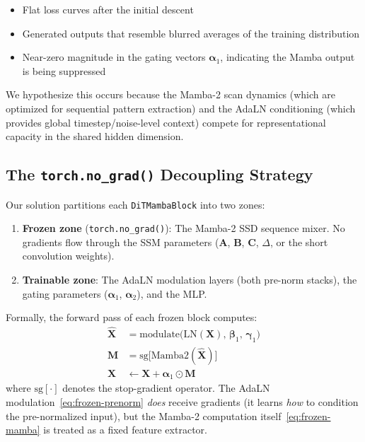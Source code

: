 \documentclass[12pt,letterpaper]{report}
\begin{document}
\begin{itemize}
    \item Flat loss curves after the initial descent
    \item Generated outputs that resemble blurred averages of the training
        distribution
    \item Near-zero magnitude in the gating vectors $\boldsymbol{\alpha}_1$,
        indicating the Mamba output is being suppressed
\end{itemize}

We hypothesize this occurs because the Mamba-2 scan dynamics (which are
optimized for sequential pattern extraction) and the AdaLN conditioning (which
provides global timestep/noise-level context) compete for representational
capacity in the shared hidden dimension. %

\subsection{The \texorpdfstring{\texttt{torch.no\_grad()}}{torch.no-grad()} Decoupling Strategy}

Our solution partitions each \texttt{DiTMambaBlock} into two zones: %

\begin{enumerate}
    \item \textbf{Frozen zone} (\texttt{torch.no\_grad()}): The Mamba-2 SSD
        sequence mixer. No gradients flow through the SSM parameters
        ($\mathbf{A}$, $\mathbf{B}$, $\mathbf{C}$, $\Delta$, or the short
        convolution weights).
    \item \textbf{Trainable zone}: The AdaLN modulation layers (both pre-norm
        stacks), the gating parameters ($\boldsymbol{\alpha}_1$,
        $\boldsymbol{\alpha}_2$), and the MLP.
\end{enumerate}

Formally, the forward pass of each frozen block computes:
%
\begin{align}
    \hat{\mathbf{X}} &= \mathrm{modulate}\bigl(\mathrm{LN}(\mathbf{X}),\, \boldsymbol{\beta}_1,\, \boldsymbol{\gamma}_1\bigr) \label{eq:frozen-prenorm} \\
    \mathbf{M} &= \mathrm{sg}\bigl[\mathrm{Mamba2}(\hat{\mathbf{X}})\bigr] \label{eq:frozen-mamba} \\
    \mathbf{X} &\leftarrow \mathbf{X} + \boldsymbol{\alpha}_1 \odot \mathbf{M} \label{eq:frozen-gate}
\end{align}
%
where $\mathrm{sg}[\cdot]$ denotes the stop-gradient operator. The AdaLN
modulation~\eqref{eq:frozen-prenorm} \emph{does} receive gradients (it learns
\emph{how} to condition the pre-normalized input), but the Mamba-2 computation
itself~\eqref{eq:frozen-mamba} is treated as a fixed feature extractor. %
\end{document}
